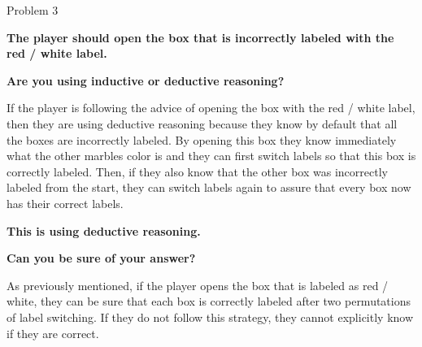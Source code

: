 \begin{problem}{Problem 3}
\begin{Highlight}[Solution]
        \begin{center}
            \textbf{The player should open the box that is incorrectly labeled with the red / white label.}
        \end{center}

        \noindent \textbf{Are you using inductive or deductive reasoning?} \vspace*{1em}

        If the player is following the advice of opening the box with the red / white label, then they are using deductive reasoning because they know by default that all the boxes are incorrectly labeled. By opening this
        box they know immediately what the other marbles color is and they can first switch labels so that this box is correctly labeled. Then, if they also know that the other box was incorrectly labeled from the start, they
        can switch labels again to assure that every box now has their correct labels.

        \begin{center}
            \textbf{This is using deductive reasoning.}
        \end{center}

        \noindent \textbf{Can you be sure of your answer?} \vspace*{1em}

        As previously mentioned, if the player opens the box that is labeled as red / white, they can be sure that each box is correctly labeled after two permutations of label switching. If they do not follow this strategy,
        they cannot explicitly know if they are correct.

    \end{Highlight}
\end{problem}

